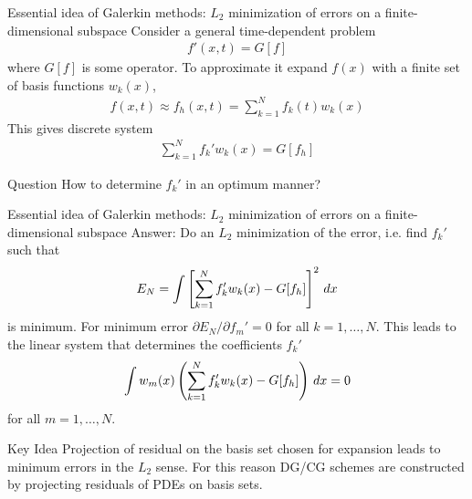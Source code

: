 \documentclass[pdf]{beamer}
\newcommand{\mypause}{\pause}
\theoremstyle{definition}
\begin{document}
\begin{frame}{Essential idea of Galerkin methods: $L_2$ minimization
    of errors on a finite-dimensional subspace}
  \small
  Consider a general time-dependent problem
  \begin{align*}
    f'(x,t) = G[f]
  \end{align*}
  where $G[f]$ is some operator. To approximate it expand $f(x)$ with
  a finite set of basis functions $w_k(x)$,
  \begin{align*}
    f(x,t) \approx f_h(x,t)  = \sum_{k=1}^N f_k(t) w_k(x)
  \end{align*}
  This gives discrete system
  \begin{align*}
    \sum_{k=1}^N f_k' w_k(x) = G[f_h]
  \end{align*}
  \mypause
  \begin{block}{Question}
    How to determine $f_k'$ in an optimum manner?
  \end{block}
  
\end{frame}

\begin{frame}{Essential idea of Galerkin methods: $L_2$ minimization
    of errors on a finite-dimensional subspace}
  \small
  Answer: Do an $L_2$ minimization of the error, i.e. find $f_k'$ such
  that
  \begin{align*}
    E_N = \int \left[
      \sum_{k=1}^N f_k' w_k(x) - G[f_h]\right]^2\thinspace dx
  \end{align*}
  is minimum. For minimum error $\partial E_N/\partial f_m' = 0$ for
  all $k=1,\ldots,N$. This leads to the linear system that determines
  the coefficients $f_k'$
  \begin{align*}
    \int w_m(x) \left(
      \sum_{k=1}^N f_k' w_k(x) - G[f_h]
    \right)\thinspace dx = 0
  \end{align*}
  for all $m=1,\ldots,N$.
  \mypause
  \begin{block}{Key Idea}
    Projection of residual on the basis set chosen for expansion leads
    to minimum errors in the $L_2$ sense. For this reason DG/CG
    schemes are constructed by projecting residuals of PDEs on basis
    sets.
  \end{block}

\end{frame}
\end{document}
